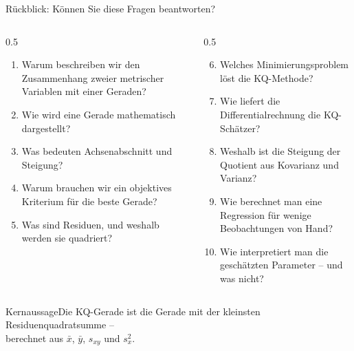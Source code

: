 \documentclass[aspectratio=169,11pt]{beamer}
\newcommand{\kernaussage}[1]{\begin{alertblock}{Kernaussage}#1\end{alertblock}}
\begin{document}
\begin{frame}{Rückblick: Können Sie diese Fragen beantworten?}
  \small
  \begin{columns}[T]
    \begin{column}{0.5\textwidth}
      \begin{enumerate}
        \setlength{\itemsep}{1pt}
        \item Warum beschreiben wir den Zusammenhang zweier metrischer Variablen
              mit einer Geraden?
        \item Wie wird eine Gerade mathematisch dargestellt?
        \item Was bedeuten Achsenabschnitt und Steigung?
        \item Warum brauchen wir ein objektives Kriterium für die beste Gerade?
        \item Was sind Residuen, und weshalb werden sie quadriert?
      \end{enumerate}
    \end{column}
    \begin{column}{0.5\textwidth}
      \begin{enumerate}
        \setcounter{enumi}{5}
        \setlength{\itemsep}{1pt}
        \item Welches Minimierungsproblem löst die KQ-Methode?
        \item Wie liefert die Differentialrechnung die KQ-Schätzer?
        \item Weshalb ist die Steigung der Quotient aus Kovarianz und Varianz?
        \item Wie berechnet man eine Regression für wenige Beobachtungen von Hand?
        \item Wie interpretiert man die geschätzten Parameter -- und was nicht?
      \end{enumerate}
    \end{column}
  \end{columns}

  \medskip

  \kernaussage{Die KQ-Gerade ist die Gerade mit der kleinsten
    Residuenquadratsumme -- \\ berechnet aus $\bar{x}$, $\bar{y}$, $s_{xy}$ und $s_x^{2}$.}
\end{frame}
\end{document}
